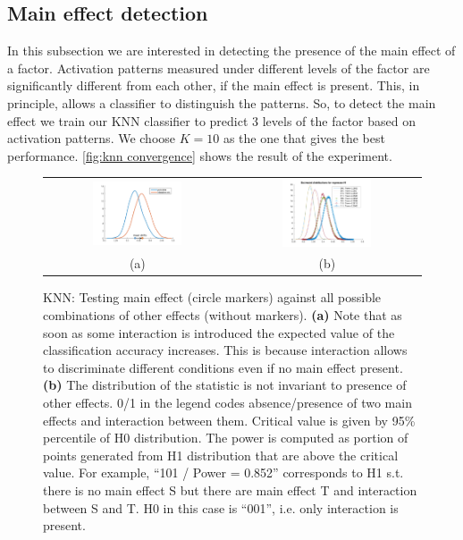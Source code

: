\documentclass[paper=a4,fontsize=12pt]{scrartcl}
\numberwithin{equation}{section} %
\numberwithin{figure}{section} %
\numberwithin{table}{section} %
\begin{document}
\subsection{Main effect detection}

In this subsection we are interested in detecting the presence of the main effect of a factor. Activation patterns measured under different levels of the factor are significantly different from each other, if the main effect is present. This, in principle, allows a classifier to distinguish the patterns. So, to detect the main effect we train our KNN classifier to predict 3 levels of the factor based on activation patterns. We choose $K=10$ as the one that gives the best performance. \autoref{fig:knn convergence} shows the result of the experiment.

\begin{figure}[t]
\begin{tabular}{cc}
\includegraphics[width=0.5\textwidth]{drift} &
\includegraphics[width=0.5\textwidth]{sample_knn_distributions_1}  \\
(a) & (b) 
\end{tabular}
\caption{KNN: Testing main effect (circle markers) against all possible combinations of other effects (without markers). \newline
{\bf (a)} Note that as soon as some interaction is introduced the expected value of the classification accuracy increases. This is because interaction allows to discriminate different conditions even if no main effect present.\newline
 {\bf (b)} The distribution of the statistic is not invariant to presence of other effects. 0/1 in the legend codes absence/presence of two main effects and interaction between them. Critical value is given by 95\% percentile of H0 distribution. The power is computed as portion of points generated from H1 distribution that are above the critical value.  For example, ``101 / Power = 0.852'' corresponds to H1 s.t. there is no main effect S but there are main effect T and interaction between S and T. H0 in this case is ``001'', i.e. only interaction is present.}\label{fig:knn drift}
\end{figure}
\end{document}
